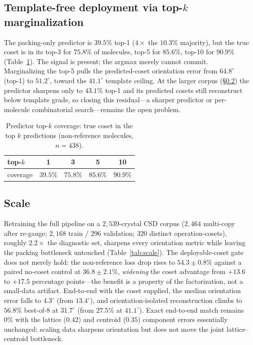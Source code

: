 \documentclass[journal=acsodf,manuscript=article]{achemso}
\begin{document}
\subsection{Template-free deployment via top-$k$ marginalization}\label{sec:free}
The packing-only predictor is $39.5\%$ top-1 ($4\times$ the $10.3\%$ majority), but
the true coset is in its top-3 for $75.8\%$ of molecules, top-5 for $85.6\%$,
top-10 for $90.9\%$ (Table~\ref{tab:cover}). The signal is present; the argmax
merely cannot commit. Marginalizing the top-5 pulls the predicted-coset orientation
error from $64.8^\circ$ (top-1) to $51.2^\circ$, toward the $41.1^\circ$ template
ceiling. At the larger corpus (\S\ref{sec:scale}) the predictor sharpens only to
$43.1\%$ top-1 and its predicted cosets still reconstruct below template grade, so
closing this residual---a sharper predictor or per-molecule combinatorial
search---remains the open problem.

\begin{table}[t]\centering
\caption{Predictor top-$k$ coverage: true coset in the top $k$ predictions
(non-reference molecules, $n{=}438$).}
\label{tab:cover}
\begin{tabular}{lcccc}\toprule
top-$k$ & 1 & 3 & 5 & 10 \\\midrule
coverage & $39.5\%$ & $75.8\%$ & $85.6\%$ & $90.9\%$ \\\bottomrule
\end{tabular}
\end{table}

\subsection{Scale}\label{sec:scale}
Retraining the full pipeline on a $2{,}539$-crystal CSD corpus ($2{,}464$
multi-copy after re-gauge; $2{,}168$ train / $296$ validation; $320$ distinct
operation-cosets), roughly $2.2\times$ the diagnostic set, sharpens every
orientation metric while leaving the packing bottleneck untouched
(Table~\ref{tab:scale}). The deployable-coset gate does not merely hold: the
non-reference loss drop rises to $54.3\pm0.8\%$ against a paired no-coset control at
$36.8\pm2.1\%$, \emph{widening} the coset advantage from $+13.6$ to $+17.5$
percentage points---the benefit is a property of the factorization, not a
small-data artifact. End-to-end with the coset supplied, the median orientation
error falls to $4.3^\circ$ (from $13.4^\circ$), and orientation-isolated
reconstruction climbs to $56.8\%$ best-of-$8$ at $31.7^\circ$ (from $27.5\%$ at
$41.1^\circ$). Exact end-to-end match remains $0\%$ with the lattice ($0.42$) and
centroid ($0.35$) component errors essentially unchanged: scaling data sharpens
orientation but does not move the joint lattice--centroid bottleneck.
\end{document}
